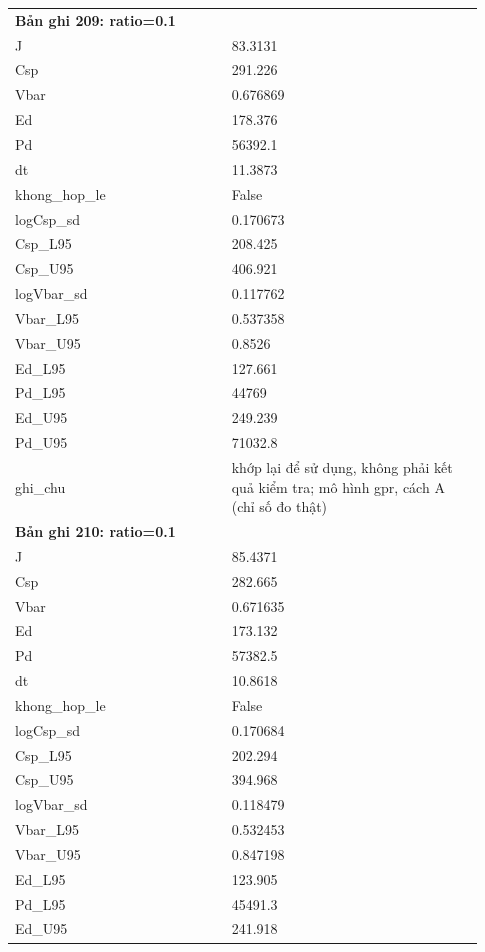 \begin{longtable}{p{0.43\linewidth}p{0.50\linewidth}}
\midrule
\multicolumn{2}{p{0.95\linewidth}}{\textbf{Bản ghi 209: ratio=0.1}} \\
J & 83.3131 \\
Csp & 291.226 \\
Vbar & 0.676869 \\
Ed & 178.376 \\
Pd & 56392.1 \\
dt & 11.3873 \\
khong\_\allowbreak hop\_\allowbreak le & False \\
logCsp\_\allowbreak sd & 0.170673 \\
Csp\_\allowbreak L95 & 208.425 \\
Csp\_\allowbreak U95 & 406.921 \\
logVbar\_\allowbreak sd & 0.117762 \\
Vbar\_\allowbreak L95 & 0.537358 \\
Vbar\_\allowbreak U95 & 0.8526 \\
Ed\_\allowbreak L95 & 127.661 \\
Pd\_\allowbreak L95 & 44769 \\
Ed\_\allowbreak U95 & 249.239 \\
Pd\_\allowbreak U95 & 71032.8 \\
ghi\_\allowbreak chu & khớp lại để sử dụng, không phải kết quả kiểm tra; mô hình gpr, cách A (chỉ số đo thật) \\
\midrule
\multicolumn{2}{p{0.95\linewidth}}{\textbf{Bản ghi 210: ratio=0.1}} \\
J & 85.4371 \\
Csp & 282.665 \\
Vbar & 0.671635 \\
Ed & 173.132 \\
Pd & 57382.5 \\
dt & 10.8618 \\
khong\_\allowbreak hop\_\allowbreak le & False \\
logCsp\_\allowbreak sd & 0.170684 \\
Csp\_\allowbreak L95 & 202.294 \\
Csp\_\allowbreak U95 & 394.968 \\
logVbar\_\allowbreak sd & 0.118479 \\
Vbar\_\allowbreak L95 & 0.532453 \\
Vbar\_\allowbreak U95 & 0.847198 \\
Ed\_\allowbreak L95 & 123.905 \\
Pd\_\allowbreak L95 & 45491.3 \\
Ed\_\allowbreak U95 & 241.918 \\

\end{longtable}
